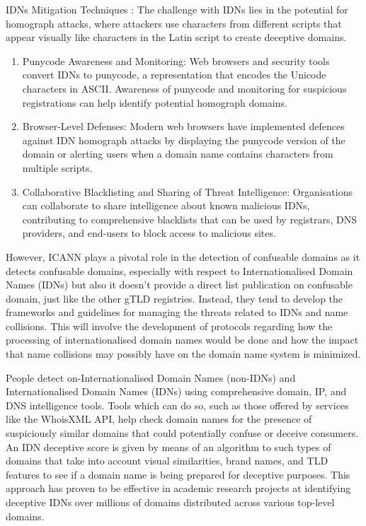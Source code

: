 IDNs Mitigation Techniques : The challenge with IDNs lies in the potential for homograph attacks, where attackers use characters from different scripts that appear visually like characters in the Latin script to create deceptive domains.

\begin{enumerate}
  \item Punycode Awareness and Monitoring: Web browsers and security tools convert IDNs to punycode, a representation that encodes the Unicode characters in ASCII. Awareness of punycode and monitoring for suspicious registrations can help identify potential homograph domains. \cite{SOCRadar2023}
  \item Browser-Level Defenses: Modern web browsers have implemented defences against IDN homograph attacks by displaying the punycode version of the domain or alerting users when a domain name contains characters from multiple scripts. \cite{Malwarebytes2017}
  \item Collaborative Blacklisting and Sharing of Threat Intelligence: Organisations can collaborate to share intelligence about known malicious IDNs, contributing to comprehensive blacklists that can be used by registrars, DNS providers, and end-users to block access to malicious sites. \cite{CyberThreatAlliance2023}
  
\end{enumerate}


However, ICANN plays a pivotal role in the detection of confusable domains as it detects confusable domains, especially with respect to Internationalised Domain Names (IDNs) but also it doesn't provide a direct list publication on confusable domain, just like the other gTLD registries. Instead, they tend to develop the frameworks and guidelines for managing the threats related to IDNs and name collisions. This will involve the development of protocols regarding how the processing of internationalised domain names would be done and how the impact that name collisions may possibly have on the domain name system is minimized. \cite{ICANNIDNs}

People detect on-Internationalised Domain Names (non-IDNs) and Internationalised Domain Names (IDNs) using comprehensive domain, IP, and DNS intelligence tools. Tools which can do so, such as those offered by services like the WhoisXML API, help check domain names for the presence of suspiciously similar domains that could potentially confuse or deceive consumers. An IDN deceptive score is given by means of an algorithm to such types of domains that take into account visual similarities, brand names, and TLD features to see if a domain name is being prepared for deceptive purposes. This approach has proven to be effective in academic research projects at identifying deceptive IDNs over millions of domains distributed across various top-level domains. \cite{WhoisXMLAPI}


